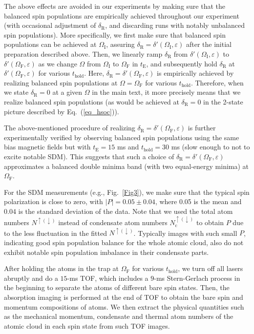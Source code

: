 \documentclass[showpacs,preprintnumbers,amsmath,amssymb, superscriptaddress, aps, reprint]{revtex4-1}
\def\deltaR{\delta_{\text{R}}}
\def\OmegaF{\Omega_{\text{F}}}
\def\OmegaI{\Omega_{\text{I}}}
\def\thold{t_{\text{hold}}}
\begin{document}
{{{The above effects are avoided in our experiments by making sure that the balanced spin populations are empirically achieved throughout our experiment (with occasional adjustment of $\deltaR$, and discarding runs with notably unbalanced spin populations). More specifically, we first make sure that balanced spin populations can be achieved at $\OmegaI$, assuring ${\deltaR}=\delta '(\OmegaI,\varepsilon )$ after the initial preparation described above. Then, we linearly ramp ${\deltaR}$ from $\delta '(\OmegaI,\varepsilon )$ to $\delta '(\OmegaF,\varepsilon )$ as we change $\Omega$ from $\OmegaI$ to $\OmegaF$ in $t_{\text{E}}$, and subsequently hold $\deltaR$ at $\delta '(\OmegaF,\varepsilon )$ for various $\thold$. Here, $\deltaR=\delta '(\OmegaF,\varepsilon )$ is empirically achieved by realizing balanced spin populations at $\Omega=\OmegaF$ for various $\thold$. Therefore, when we state $\deltaR=0$ at a given $\Omega$ in the main text, it more precisely means that we realize balanced spin populations (as would be achieved at $\deltaR=0$ in the 2-state picture described by Eq.~(\ref{eq_hsoc})).

The above-mentioned procedure of realizing $\deltaR=\delta '(\OmegaF,\varepsilon )$ is further experimentally verified by observing balanced spin populations using the same bias magnetic fields but with $t_{\text{E}}=15$ ms and $\thold=30$ ms (slow enough to not to excite notable SDM). This suggests that such a choice of $\deltaR = \delta '(\OmegaF,\varepsilon )$ approximates a balanced double minima band (with two equal-energy minima) at $\OmegaF$.

For the SDM measurements (e.g., Fig.~\ref{Fig3}), we make sure that the typical spin polarization is close to zero, with $\left| P \right| = 0.05 \pm 0.04$, where 0.05 is the mean and 0.04 is the standard deviation of the data. Note that we used the total atom numbers $N^{\uparrow (\downarrow)}$ instead of condensate atom numbers $N_{\text{c}}^{\uparrow (\downarrow)}$ to obtain $P$ due to the less fluctuation in the fitted $N^{\uparrow (\downarrow)}$. Typically images with such small $P$, indicating good spin population balance for the whole atomic cloud, also do not exhibit notable spin population imbalance in their condensate parts.

After holding the atoms in the trap at $\OmegaF$ for various $\thold$, we turn off all lasers abruptly and do a $15$-ms TOF, which includes a $9$-ms Stern-Gerlach process in the beginning to separate the atoms of different bare spin states. Then, the absorption imaging is performed at the end of TOF to obtain the bare spin and momentum compositions of atoms. We then extract the physical quantities such as the mechanical momentum, condensate and thermal atom numbers of the atomic cloud in each spin state from such TOF images.


}}}
\end{document}
